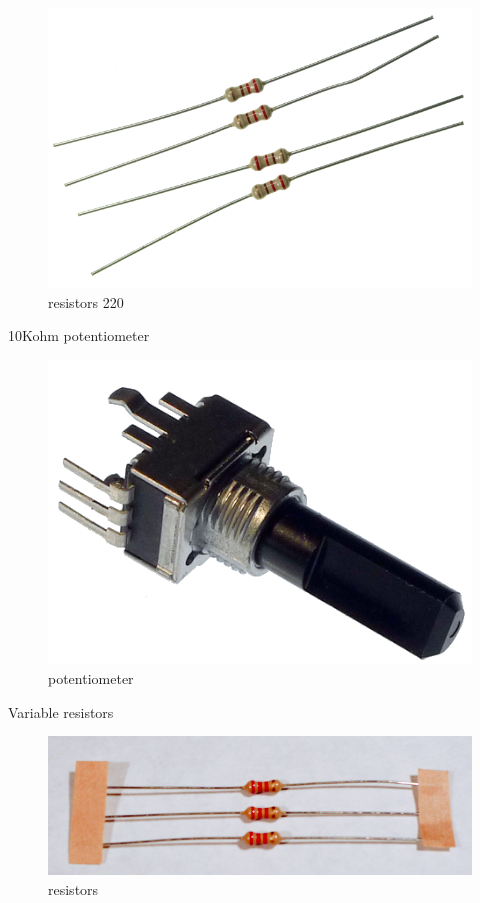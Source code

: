 \begin{figure}[!htb]
 \centering
 \includegraphics[scale=0.3]{img/analogio/resistors_220.png}
 \caption{resistors 220}
 \label{resistors 220}
\end{figure}

10Kohm potentiometer

\begin{figure}[!htb]
 \centering
 \includegraphics[scale=0.3]{img/analogio/potentiometer.png}
 \caption{potentiometer}
 \label{potentiometer}
\end{figure}

Variable resistors


\begin{figure}[!htb]
 \centering
 \includegraphics[scale=0.3]{img/analogio/resistors.jpg}
 \caption{resistors}
 \label{resistors}
\end{figure}

